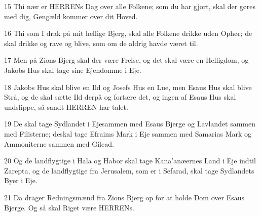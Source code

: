 \par 15 Thi nær er HERRENs Dag over alle Folkene; som du har gjort, skal der gøres med dig, Gengæld kommer over dit Hoved.
\par 16 Thi som I drak på mit hellige Bjerg, skal alle Folkene drikke uden Ophør; de skal drikke og rave og blive, som om de aldrig havde været til.
\par 17 Men på Zions Bjerg skal der være Frelse, og det skal være en Helligdom, og Jakobs Hus skal tage sine Ejendomme i Eje.
\par 18 Jakobs Hus skal blive en Ild og Josefs Hus en Lue, men Esaus Hus skal blive Strå, og de skal sætte Ild derpå og fortære det, og ingen af Esaus Hus skal undslippe, så sandt HERREN har talet.
\par 19 De skal tage Sydlandet i Ejesammen med Esaus Bjerge og Lavlandet sammen med Filisterne; deskal tage Efraims Mark i Eje sammen med Samarias Mark og Ammoniterne sammen med Gilead.
\par 20 Og de landflygtige i Hala og Habor skal tage Kana'anæernes Land i Eje indtil Zarepta, og de landflygtige fra Jerusalem, som er i Sefarad, skal tage Sydlandets Byer i Eje.
\par 21 Da drager Redningsmænd fra Zions Bjerg op for at holde Dom over Esaus Bjerge. Og så skal Riget være HERRENs.


